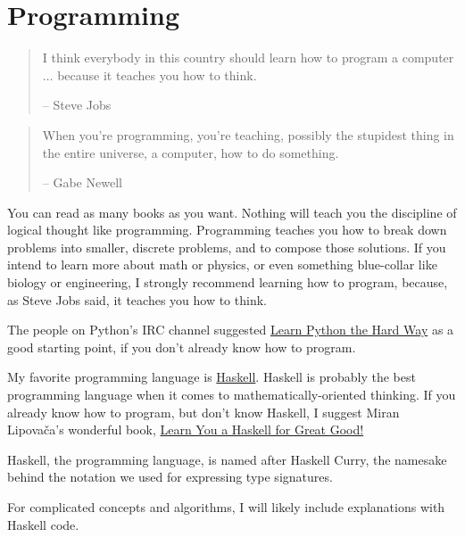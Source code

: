 \section{Programming}

\begin{quotation}
  I think everybody in this country should learn how to program a
  computer $\ldots$ because it teaches you how to think.

  -- Steve Jobs
\end{quotation}

\begin{quotation}
  When you're programming, you're teaching, possibly the stupidest thing in the
  entire universe, a computer, how to do something.
  
  -- Gabe Newell
\end{quotation}

You can read as many books as you want. Nothing will teach you the discipline of
logical thought like programming. Programming teaches you how to break down
problems into smaller, discrete problems, and to compose those solutions. If you
intend to learn more about math or physics, or even something blue-collar like
biology or engineering, I strongly recommend learning how to program, because,
as Steve Jobs said, it teaches you how to think.

The people on Python's IRC channel suggested
\href{http://learnpythonthehardway.org/book/}{Learn Python the Hard Way} as a
good starting point, if you don't already know how to program.

My favorite programming language is
\href{http://en.wikipedia.org/wiki/Haskell_(programming_language)}{Haskell}. Haskell
is probably the best programming language when it comes to
mathematically-oriented thinking. If you already know how to program, but don't
know Haskell, I suggest Miran Lipovača's wonderful book,
\href{http://learnyouahaskell.com/chapters}{Learn You a Haskell for Great Good!}

Haskell, the programming language, is named after Haskell Curry, the namesake
behind the notation we used for expressing type signatures.

For complicated concepts and algorithms, I will likely include explanations with
Haskell code. 
